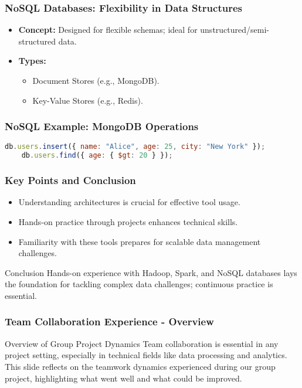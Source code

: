 \documentclass[aspectratio=169]{beamer}
\begin{document}
\begin{frame}
    \frametitle{NoSQL Databases: Flexibility in Data Structures}
    \begin{itemize}
        \item \textbf{Concept:} Designed for flexible schemas; ideal for unstructured/semi-structured data.
        \item \textbf{Types:}
        \begin{itemize}
            \item Document Stores (e.g., MongoDB).
            \item Key-Value Stores (e.g., Redis).
        \end{itemize}
    \end{itemize}
\end{frame}

\begin{frame}[fragile]
    \frametitle{NoSQL Example: MongoDB Operations}
    \begin{lstlisting}[language=JavaScript]
    db.users.insert({ name: "Alice", age: 25, city: "New York" });
    db.users.find({ age: { $gt: 20 } });
    \end{lstlisting}
\end{frame}

\begin{frame}
    \frametitle{Key Points and Conclusion}
    \begin{itemize}
        \item Understanding architectures is crucial for effective tool usage.
        \item Hands-on practice through projects enhances technical skills.
        \item Familiarity with these tools prepares for scalable data management challenges.
    \end{itemize}
    \begin{block}{Conclusion}
        Hands-on experience with Hadoop, Spark, and NoSQL databases lays the foundation for tackling complex data challenges; continuous practice is essential.
    \end{block}
\end{frame}

\begin{frame}[fragile]
    \frametitle{Team Collaboration Experience - Overview}
    \begin{block}{Overview of Group Project Dynamics}
        Team collaboration is essential in any project setting, especially in technical fields like data processing and analytics. 
        This slide reflects on the teamwork dynamics experienced during our group project, highlighting what went well and what could be improved.
    \end{block}
\end{frame}
\end{document}
